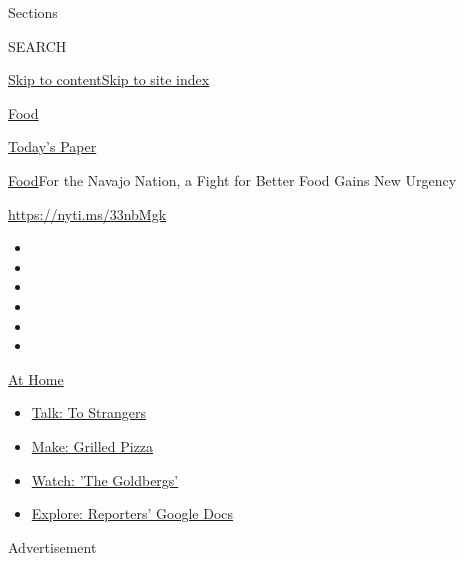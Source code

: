 Sections

SEARCH

\protect\hyperlink{site-content}{Skip to
content}\protect\hyperlink{site-index}{Skip to site index}

\href{https://www.nytimes.com/section/food}{Food}

\href{https://myaccount.nytimes.com/auth/login?response_type=cookie\&client_id=vi}{}

\href{https://www.nytimes.com/section/todayspaper}{Today's Paper}

\href{/section/food}{Food}\textbar{}For the Navajo Nation, a Fight for
Better Food Gains New Urgency

\url{https://nyti.ms/33nbMgk}

\begin{itemize}
\item
\item
\item
\item
\item
\item
\end{itemize}

\href{https://www.nytimes.com/spotlight/at-home?action=click\&pgtype=Article\&state=default\&region=TOP_BANNER\&context=at_home_menu}{At
Home}

\begin{itemize}
\tightlist
\item
  \href{https://www.nytimes.com/2020/08/03/well/family/the-benefits-of-talking-to-strangers.html?action=click\&pgtype=Article\&state=default\&region=TOP_BANNER\&context=at_home_menu}{Talk:
  To Strangers}
\item
  \href{https://www.nytimes.com/2020/08/01/at-home/coronavirus-make-pizza-on-a-grill.html?action=click\&pgtype=Article\&state=default\&region=TOP_BANNER\&context=at_home_menu}{Make:
  Grilled Pizza}
\item
  \href{https://www.nytimes.com/2020/07/31/arts/television/goldbergs-abc-stream.html?action=click\&pgtype=Article\&state=default\&region=TOP_BANNER\&context=at_home_menu}{Watch:
  'The Goldbergs'}
\item
  \href{https://www.nytimes.com/interactive/2020/at-home/even-more-reporters-editors-diaries-lists-recommendations.html?action=click\&pgtype=Article\&state=default\&region=TOP_BANNER\&context=at_home_menu}{Explore:
  Reporters' Google Docs}
\end{itemize}

Advertisement

